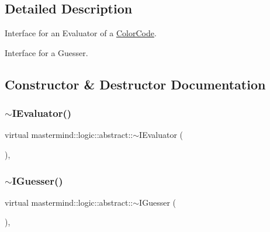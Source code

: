 \subsection{Detailed Description}
Interface for an Evaluator of a \hyperlink{classmastermind_1_1logic_1_1_color_code}{Color\+Code}. 

Interface for a Guesser. 

\subsection{Constructor \& Destructor Documentation}
\hypertarget{classmastermind_1_1logic_1_1abstract_a901e84f7a39b9b80224a94ec90b14c25}{}\label{classmastermind_1_1logic_1_1abstract_a901e84f7a39b9b80224a94ec90b14c25} 
\subsubsection{\texorpdfstring{$\sim$\+I\+Evaluator()}{~IEvaluator()}}
{\footnotesize\ttfamily virtual mastermind\+::logic\+::abstract\+::$\sim$\+I\+Evaluator (\begin{DoxyParamCaption}{ }\end{DoxyParamCaption})\hspace{0.3cm}{\ttfamily [inline]}, {\ttfamily [virtual]}}

\hypertarget{classmastermind_1_1logic_1_1abstract_a54d92c8c0accd2d4fbc7ea47f898c18f}{}\label{classmastermind_1_1logic_1_1abstract_a54d92c8c0accd2d4fbc7ea47f898c18f} 
\subsubsection{\texorpdfstring{$\sim$\+I\+Guesser()}{~IGuesser()}}
{\footnotesize\ttfamily virtual mastermind\+::logic\+::abstract\+::$\sim$\+I\+Guesser (\begin{DoxyParamCaption}{ }\end{DoxyParamCaption})\hspace{0.3cm}{\ttfamily [inline]}, {\ttfamily [virtual]}}




